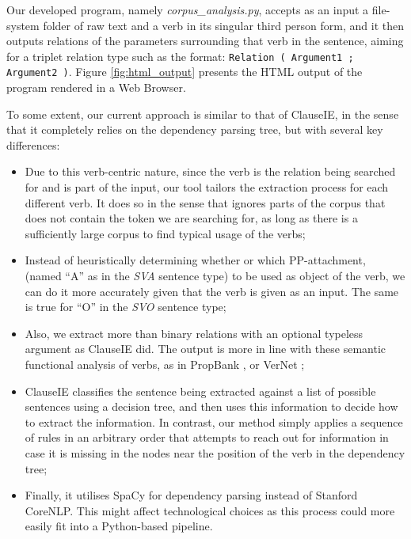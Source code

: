 \documentclass[11pt,a4paper,openright]{memoir}
\begin{document}
Our developed program, namely \emph{corpus\_analysis.py}, accepts as an input a file-system folder of raw text and a verb in its singular third person form, and it then outputs relations of the parameters surrounding that verb in the sentence, aiming for a triplet relation type such as the format: \texttt{Relation ( Argument1 ; Argument2 )}. Figure \ref{fig:html_output} presents the HTML output of the program rendered in a Web Browser.

To some extent, our current approach is similar to that of ClauseIE, in the sense that it completely relies on the dependency parsing tree, but with several key differences:

\begin{itemize}
	\item Due to this verb-centric nature, since the verb is the relation being searched for and is part of the input, our tool tailors the extraction process for each different verb. It does so in the sense that ignores parts of the corpus that does not contain the token we are searching for, as long as there is a sufficiently large corpus to find typical usage of the verbs;
	\item Instead of heuristically determining whether or which PP-attachment, (named \enquote{A} as in the \emph{SVA} sentence type) to be used as object of the verb, we can do it more accurately given that the verb is given as an input. The same is true for \enquote{O} in the \emph{SVO} sentence type;
	\item Also, we extract more than binary relations with an optional typeless argument as ClauseIE did. The output is more in line with these semantic functional analysis of verbs, as in PropBank \cite{Palmer:2005:PBA:1122624.1122628}, or VerNet \cite{Schuler:2005:VBC:1104493};
	\item ClauseIE classifies the sentence being extracted against a list of possible sentences using a decision tree, and then uses this information to decide how to extract the information. In contrast, our method simply applies a sequence of rules in an arbitrary order that attempts to reach out for information in case it is missing in the nodes near the position of the verb in the dependency tree;
	\item Finally, it utilises SpaCy for dependency parsing instead of Stanford CoreNLP. This might affect technological choices as this process could more easily fit into a Python-based pipeline.
\end{itemize}
\end{document}
